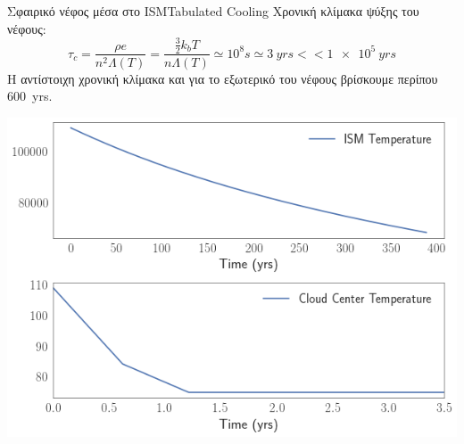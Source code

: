 \documentclass{beamer}
\begin{document}
\begin{frame}{Σφαιρικό νέφος μέσα στο ISM}{Tabulated Cooling}
Χρονική κλίμακα ψύξης του νέφους:
	\begin{equation}
	\tau _c =\frac{ \rho e} {n^2 \Lambda (T)}=
	\frac{ \frac{3}{2}k_b T} {n \Lambda (T)} 
	\simeq 10^8\si{s}\simeq \SI{3}{yrs} << \SI{1e5}{yrs}
	\end{equation}
	H αντίστοιχη χρονική κλίμακα και για το εξωτερικό του νέφους βρίσκουμε περίπου \SI{600}{yrs}. 
	
\begin{center}
	\includegraphics[width=0.6\linewidth]{../Document/DataImages/TabCoolingTMPcenterISM}
\end{center}
\end{frame}
\end{document}
